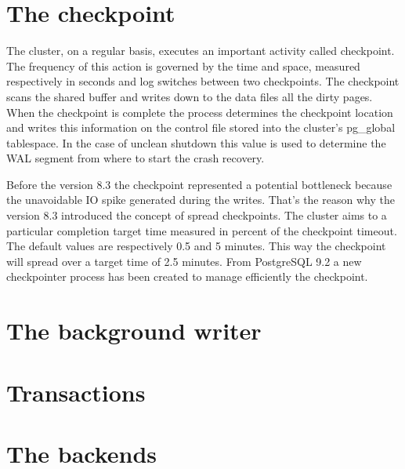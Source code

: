 \section{The checkpoint}
The cluster, on a regular basis, executes an important activity called checkpoint. The frequency 
of this action is governed by the time and space, measured respectively in seconds and log switches between 
two checkpoints. The checkpoint scans the shared buffer and writes down to the data files all the dirty 
pages. When the checkpoint is complete the process determines the checkpoint location and writes this 
information on the control file stored into the cluster's pg\_global tablespace. In the case of unclean 
shutdown this value is used to determine the WAL segment from where to start the crash recovery. \newline

Before the version 8.3 the checkpoint represented a potential bottleneck because the unavoidable IO spike 
generated during the writes. That's the reason why the version 8.3 introduced the concept of spread 
checkpoints. The cluster aims to a particular completion target time measured in percent of the checkpoint 
timeout. The default values are respectively 0.5 and 5 minutes. This way the checkpoint will spread over a 
target time of 2.5 minutes. From PostgreSQL 9.2 a new checkpointer process has been created to manage 
efficiently the checkpoint.


\section{The background writer}


\section{Transactions}


\section{The backends}

